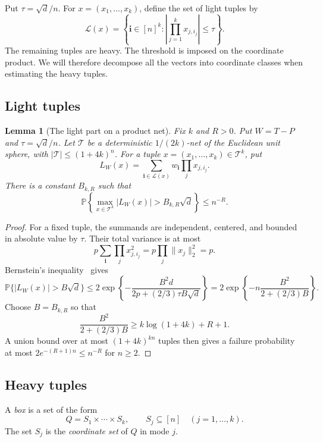 \documentclass[11pt,reqno]{amsart}
\numberwithin{equation}{section}
\newtheorem{lemma}[theorem]{Lemma}
\theoremstyle{definition}
\theoremstyle{remark}
\newcommand{\Pp}{\mathbb P}
\begin{document}
Put $\tau=\sqrt d/n$. For $x=(x_1,\ldots,x_k)$, define the set of light tuples by
\begin{equation}\label{eq:light-set}
 \mathcal L(x)
 =\left\{\mathbf i\in[n]^k:
             \left|\prod_{j=1}^k x_{j,i_j}\right|\le\tau\right\}.
\end{equation}
The remaining tuples are heavy. The threshold is imposed on the
coordinate product. We will therefore
decompose all the vectors into coordinate classes when estimating
the heavy tuples.

\subsection{Light tuples}\label{sec:light}

\begin{lemma}[The light part on a product net]\label{lem:light}
Fix $k$ and $R>0$. Put $W=T-P$ and $\tau=\sqrt d/n$.
Let $\mathcal T$ be a deterministic $1/(2k)$-net of the Euclidean unit sphere,
with $|\mathcal T|\le(1+4k)^n$. For a tuple
$x=(x_1,\ldots,x_k)\in\mathcal T^k$, put
\[
 L_W(x)=\sum_{\mathbf i\in\mathcal L(x)}
           w_{\mathbf i}\prod_jx_{j,i_j}.
\]
There is a constant $B_{k,R}$ such that
\[
 \Pp\left\{\max_{x\in\mathcal T^k}|L_W(x)|>
                         B_{k,R}\sqrt d\right\}\le n^{-R}.
\]
\end{lemma}
\begin{proof}
For a fixed tuple, the summands are independent, centered, and bounded
in absolute value by $\tau$. Their total variance is at most
\[
 p\sum_{\mathbf i}\prod_jx_{j,i_j}^2
       =p\prod_j\|x_j\|_2^2=p.
\]
Bernstein's inequality~\cite[Theorem~2.9.5]{V26} gives
\[
 \Pp\{|L_W(x)|>B\sqrt d\}
 \le2\exp\left\{-\frac{B^2d}{2p+(2/3)\tau B\sqrt d}\right\}
 =2\exp\left\{-n\frac{B^2}{2+(2/3)B}\right\}.
\]
Choose $B=B_{k,R}$ so that
\[
 \frac{B^2}{2+(2/3)B}\ge k\log(1+4k)+R+1.
\]
A union bound over at most $(1+4k)^{kn}$ tuples then gives a failure
probability at most $2e^{-(R+1)n}\le n^{-R}$ for $n\ge2$.
\end{proof}


\subsection{Heavy tuples}\label{sec:heavy}

A \emph{box} is a set of the form
\[
 Q=S_1\times\cdots\times S_k,
 \qquad S_j\subseteq[n]\quad(j=1,\ldots,k).
\]
The set $S_j$ is the \emph{coordinate set} of $Q$ in mode $j$.
\end{document}

